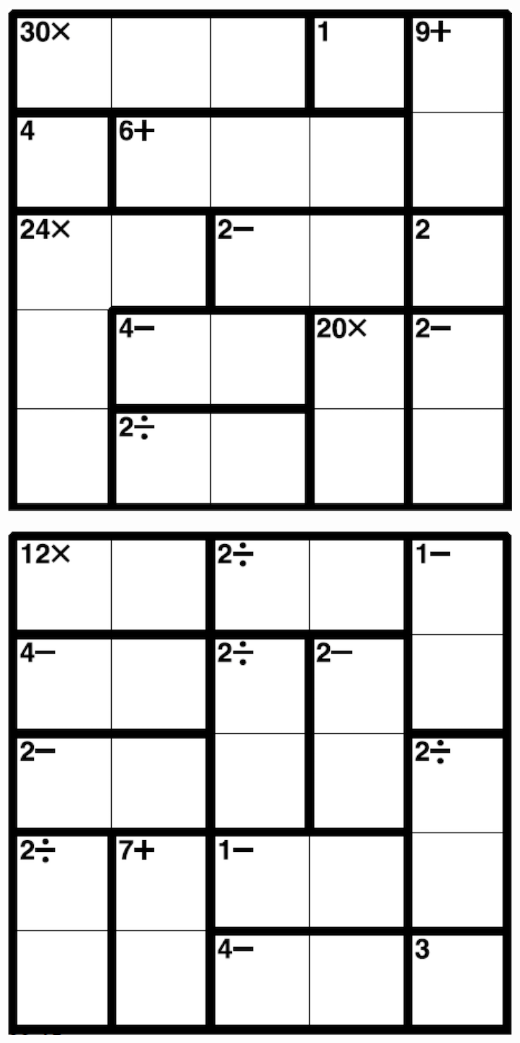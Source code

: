 
\includegraphics[scale=1]{Gambar/Lampiran/5x5_3.png}

\includegraphics[scale=1]{Gambar/Lampiran/5x5_4.png}
